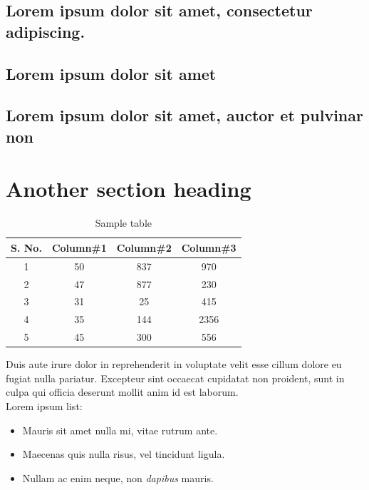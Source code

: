 \lipsum[1-2]

\subsection{Lorem ipsum dolor sit amet, consectetur adipiscing.}
\lipsum[1-2]

\subsection{Lorem ipsum dolor sit amet}
\lipsum[1-2]

\subsection{Lorem ipsum dolor sit amet, auctor et pulvinar non}
\lipsum[1-2] 


\section{Another section heading}
\lipsum[1-2]

\begin{table}[ht]
\caption{Sample table} %
\centering %
\begin{tabular}{c c c c}
\hline\hline %
S. No. & Column\#1 & Column\#2 & Column\#3 \\ [0.5ex]
\hline %
1 & 50 & 837 & 970 \\
2 & 47 & 877 & 230 \\
3 & 31 & 25 & 415 \\
4 & 35 & 144 & 2356 \\
5 & 45 & 300 & 556 \\ [1ex] %
\hline %
\end{tabular}
\label{table:nonlin} %
\end{table}

Duis aute irure dolor in reprehenderit in voluptate velit esse cillum dolore eu fugiat nulla pariatur. Excepteur sint occaecat cupidatat non proident, sunt in culpa qui officia deserunt mollit anim id est laborum. \\ Lorem ipsum list:
\begin{itemize}
\item Mauris sit amet nulla mi, vitae rutrum ante.
\item Maecenas quis nulla risus, vel tincidunt ligula.
\item Nullam ac enim neque, non \emph{dapibus} mauris.
\end{itemize}
 


